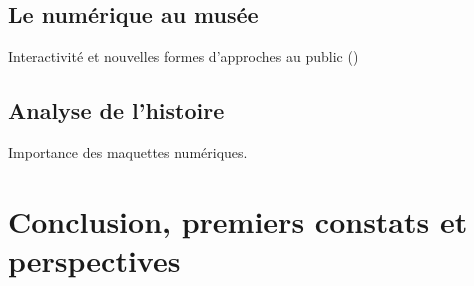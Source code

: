 \documentclass[a4paper,11pt,french]{article}
\begin{document}
\subsection{Le numérique au musée}
Interactivité et nouvelles formes d'approches au public ()
\cite{LAROCHE-2010-473007}

\subsection{Analyse de l'histoire}
Importance des maquettes numériques\cite{Cotte2009}.

\section{Conclusion, premiers constats et perspectives}


\newpage
\singlespacing
\begin{footnotesize}
   
  
\end{footnotesize}
\doublespacing
\end{document}
